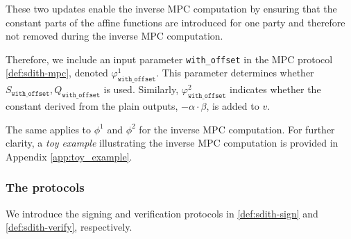 \documentclass[11pt]{report}
\theoremstyle{definition}
\theoremstyle{plain}
\begin{document}
These two updates enable the inverse MPC computation by ensuring that the constant parts of the affine functions are introduced for one party and therefore not removed during the inverse MPC computation.

Therefore, we include an input parameter \texttt{with\_offset} in the MPC protocol \autoref{def:sdith-mpc}, denoted $\varphi^1_{\texttt{with\_offset}}$. This parameter determines whether $S_{\texttt{with\_offset}}, Q_{\texttt{with\_offset}}$ is used. Similarly, $\varphi^2_{\texttt{with\_offset}}$ indicates whether the constant derived from the plain outputs, $-\alpha \cdot \beta$, is added to $v$.

The same applies to $\phi^1$ and $\phi^2$ for the inverse MPC computation. For further clarity, a \textit{toy example} illustrating the inverse MPC computation is provided in Appendix \ref{app:toy_example}.

\subsubsection{The protocols}
We introduce the signing and verification protocols in \autoref{def:sdith-sign} and \autoref{def:sdith-verify}, respectively.
\end{document}
